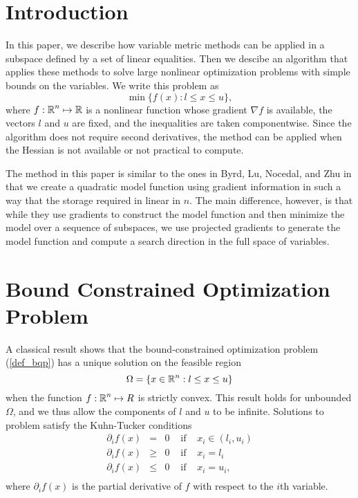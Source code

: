 \section{Introduction}
In this paper, we describe how variable metric methods can be applied
in a subspace defined by a set of linear equalities.
Then we descibe an algorithm that applies these methods to solve
large nonlinear optimization problems with simple bounds
on the variables.  We write this problem as
\begin{equation} \label{def_bqp}
\min \{ f(x) : l \leq x \leq u \} ,
\end{equation}
where $f : \mbox{${\mathbb R}$}^n \mapsto \mbox{${\mathbb R}$} $ is a nonlinear function whose gradient
$\nabla f$ is available, the vectors $l$ and $u$ are fixed, and the 
inequalities are taken componentwise.
Since the algorithm does not require second derivatives, the
method can be applied when the Hessian is not available or not
practical to compute.


The method in this paper is similar to the ones in Byrd, Lu, Nocedal,
and Zhu\cite{Byrd:1995:LMA} in that we create a quadratic model function using
gradient information in such a way that the storage required in linear in $n$.
The main difference, however, is that while they use gradients 
to construct the model function and then minimize the model over a 
sequence of subspaces,
we use projected gradients
to generate the model function and compute a search direction in
the full space of variables.

\section{Bound Constrained Optimization Problem}\label{qp}

A classical result shows that the bound-constrained 
optimization problem (\ref{def_bqp}) has a  unique solution
on the feasible region
\begin{equation} \label{def_bounds}
\Omega = \{ x \in \mbox{${\mathbb R}$}^n: l \leq x \leq u \}
\end{equation}
when the function $f : \mbox{${\mathbb R}$}^n \mapsto R $ is strictly convex.
This result holds for unbounded $\Omega$, and we thus
allow the components of $l$ and $u$ to be infinite.
Solutions to problem  satisfy the Kuhn-Tucker conditions
\[ \begin{array}{lllll}
\partial_if(x) & = & 0 & \mbox{ if } & x_i \in (l_i, u_i) \\
\partial_if(x) & \geq & 0 & \mbox{ if } & x_i = l_i \\
\partial_if(x) & \leq & 0 & \mbox{ if } & x_i = u_i ,\\
\end{array}
\]
where $\partial_if(x)$ is the partial derivative of $f$ with
respect to the $i$th variable.

